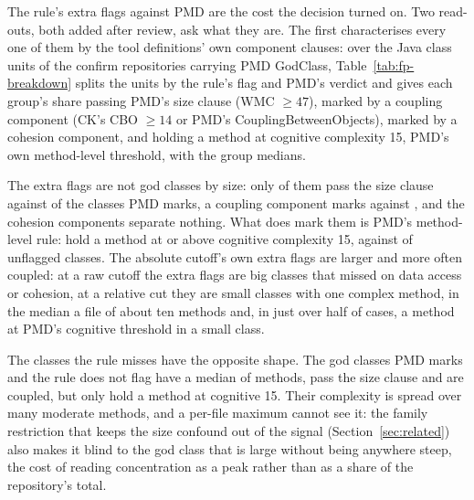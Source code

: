 \documentclass[11pt,a4paper]{article}
\newcommand{\fitwidth}[1]{\resizebox{\ifdim\width>\textwidth\textwidth\else\width\fi}{!}{#1}}
\begin{document}
The rule's extra flags against PMD are the cost the decision turned on. Two
read-outs, both added after review, ask what they are. The first
characterises every one of them by the tool definitions' own component
clauses: over the \fpUnits{} Java class units of the \fpRepos{} confirm
repositories carrying PMD GodClass, Table~\ref{tab:fp-breakdown} splits the
units by the rule's flag and PMD's verdict and gives each group's share
passing PMD's size clause (WMC $\geq 47$), marked by a coupling component
(CK's CBO $\geq 14$ or PMD's CouplingBetweenObjects), marked by a cohesion
component, and holding a method at cognitive complexity 15, PMD's own
method-level threshold, with the group medians.

\begin{table}[t]
\centering
\caption{Exploratory: every Java class unit of the confirm repositories
carrying PMD GodClass, grouped by the relative rule's flag and PMD's verdict,
with the share each group's units meet of PMD's size clause, of the coupling
and cohesion components and of PMD's method-level cognitive threshold, and
the group medians. The last row is the explore-tuned absolute cutoff's own
extra flags.}
\label{tab:fp-breakdown}
\scriptsize
\setlength{\tabcolsep}{3pt}
\fitwidth{}
\end{table}

The extra flags are not god classes by size: only \fpFpWmcFourSevenPct{} of
them pass the size clause against \fpTpWmcFourSevenPct{} of the classes PMD
marks, a coupling component marks \fpFpCoupledPct{} against
\fpTpCoupledPct{}, and the cohesion components separate nothing. What does
mark them is PMD's method-level rule: \fpFpCognitiveOneFivePct{} hold a
method at or above cognitive complexity 15, against
\fpNeitherCognitiveOneFivePct{} of unflagged classes. The absolute cutoff's
own extra flags are larger and more often coupled: at a raw cutoff the extra
flags are big classes that missed on data access or cohesion, at a relative
cut they are small classes with one complex method, in the median a file of
about ten methods and, in just over half of cases, a method at PMD's
cognitive threshold in a small class.

The classes the rule misses have the opposite shape. The \fpFnN{} god classes
PMD marks and the rule does not flag have a median of \fpFnMedianNom{}
methods, \fpFnWmcFourSevenPct{} pass the size clause and \fpFnCoupledPct{}
are coupled, but only \fpFnCognitiveOneFivePct{} hold a method at cognitive
15. Their complexity is spread over many moderate methods, and a per-file
maximum cannot see it: the family restriction that keeps the size confound
out of the signal (Section~\ref{sec:related}) also makes it blind to the god
class that is large without being anywhere steep, the cost of reading
concentration as a peak rather than as a share of the repository's total.
\end{document}
